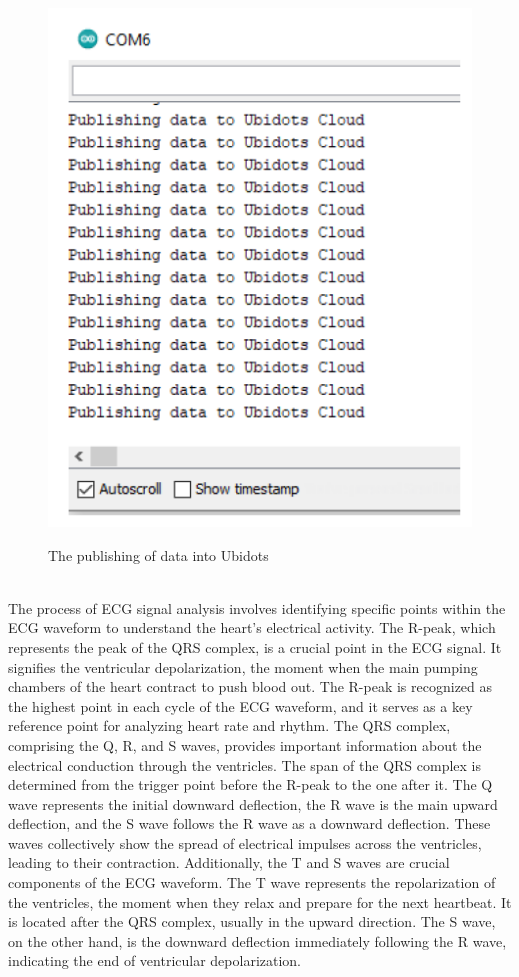  \begin{figure}[htbp]
    \centering
     \includegraphics[width=0.6\linewidth]{C_chap/fig10.png}
\\\caption{The publishing of data into Ubidots}
 \end{figure}
\\
The process of ECG signal analysis involves identifying specific points within the ECG waveform to understand the heart's electrical activity. The R-peak, which represents the peak of the QRS complex, is a crucial point in the ECG signal. It signifies the ventricular depolarization, the moment when the main pumping chambers of the heart contract to push blood out. The R-peak is recognized as the highest point in each cycle of the ECG waveform, and it serves as a key reference point for analyzing heart rate and rhythm.
The QRS complex, comprising the Q, R, and S waves, provides important information about the electrical conduction through the ventricles. The span of the QRS complex is determined from the trigger point before the R-peak to the one after it. The Q wave represents the initial downward deflection, the R wave is the main upward deflection, and the S wave follows the R wave as a downward deflection. These waves collectively show the spread of electrical impulses across the ventricles, leading to their contraction.
Additionally, the T and S waves are crucial components of the ECG waveform. The T wave represents the repolarization of the ventricles, the moment when they relax and prepare for the next heartbeat. It is located after the QRS complex, usually in the upward direction. The S wave, on the other hand, is the downward deflection immediately following the R wave, indicating the end of ventricular depolarization.
